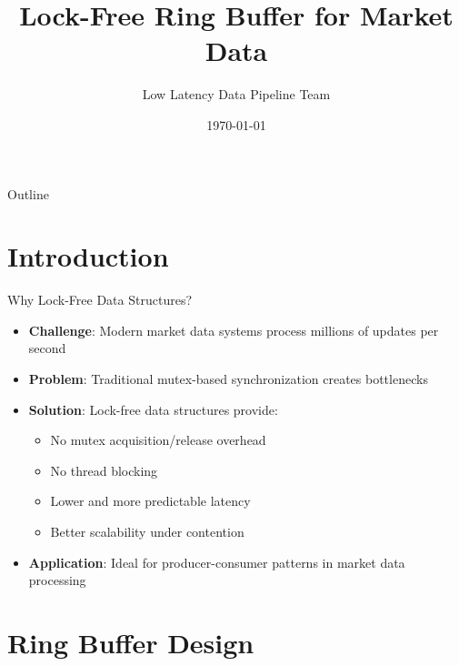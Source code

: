 \documentclass{beamer}
\title{Lock-Free Ring Buffer for Market Data}
\author{Low Latency Data Pipeline Team}
\date{\today}
\begin{document}
\begin{frame}
\titlepage
\end{frame}

\begin{frame}{Outline}
\tableofcontents
\end{frame}

\section{Introduction}

\begin{frame}{Why Lock-Free Data Structures?}
\begin{itemize}
    \item \textbf{Challenge}: Modern market data systems process millions of updates per second
    \item \textbf{Problem}: Traditional mutex-based synchronization creates bottlenecks
    \item \textbf{Solution}: Lock-free data structures provide:
    \begin{itemize}
        \item No mutex acquisition/release overhead
        \item No thread blocking
        \item Lower and more predictable latency
        \item Better scalability under contention
    \end{itemize}
    \item \textbf{Application}: Ideal for producer-consumer patterns in market data processing
\end{itemize}
\end{frame}

\section{Ring Buffer Design}
\end{document}
